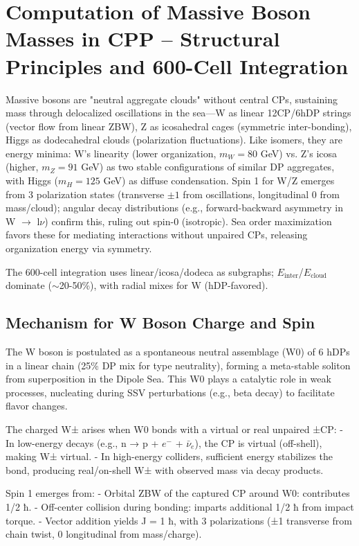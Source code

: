 \documentclass{article}
\begin{document}
\section{Computation of Massive Boson Masses in CPP -- Structural Principles and 600-Cell Integration}

Massive bosons are "neutral aggregate clouds" without central CPs, sustaining mass through delocalized oscillations in the sea—W as linear 12CP/6hDP strings (vector flow from linear ZBW), Z as icosahedral cages (symmetric inter-bonding), Higgs as dodecahedral clouds (polarization fluctuations). Like isomers, they are energy minima: W's linearity (lower organization, $m_W=80$ GeV) vs. Z's icosa (higher, $m_Z=91$ GeV) as two stable configurations of similar DP aggregates, with Higgs ($m_H=125$ GeV) as diffuse condensation. Spin 1 for W/Z emerges from 3 polarization states (transverse $\pm1$ from oscillations, longitudinal 0 from mass/cloud); angular decay distributions (e.g., forward-backward asymmetry in W $\to$ l$\nu$) confirm this, ruling out spin-0 (isotropic). Sea order maximization favors these for mediating interactions without unpaired CPs, releasing organization energy via symmetry.

The 600-cell integration uses linear/icosa/dodeca as subgraphs; $E_{\text{inter}}$/$E_{\text{cloud}}$ dominate ($\sim$20-50\%), with radial mixes for W (hDP-favored).

\subsection{Mechanism for W Boson Charge and Spin}

The W boson is postulated as a spontaneous neutral assemblage (W0) of 6 hDPs in a linear chain (25\% DP mix for type neutrality), forming a meta-stable soliton from superposition in the Dipole Sea. This W0 plays a catalytic role in weak processes, nucleating during SSV perturbations (e.g., beta decay) to facilitate flavor changes.

The charged W± arises when W0 bonds with a virtual or real unpaired ±CP:  
- In low-energy decays (e.g., n → p + $e^{-}$ + $\bar{\nu}_e$), the CP is virtual (off-shell), making W± virtual.  
- In high-energy colliders, sufficient energy stabilizes the bond, producing real/on-shell W± with observed mass via decay products.  

Spin 1 emerges from:  
- Orbital ZBW of the captured CP around W0: contributes 1/2 ħ.  
- Off-center collision during bonding: imparts additional 1/2 ħ from impact torque.  
- Vector addition yields J = 1 ħ, with 3 polarizations (±1 transverse from chain twist, 0 longitudinal from mass/charge).  
\end{document}

